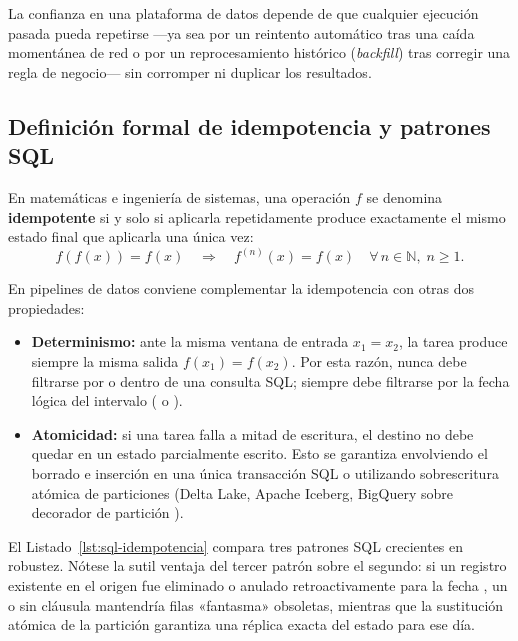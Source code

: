 La confianza en una plataforma de datos depende de que cualquier ejecución pasada pueda repetirse ---ya sea por un reintento automático tras una caída momentánea de red o por un reprocesamiento histórico (\textit{backfill}) tras corregir una regla de negocio--- sin corromper ni duplicar los resultados.

\subsection{Definición formal de idempotencia y patrones SQL}

En matemáticas e ingeniería de sistemas, una operación $f$ se denomina \textbf{idempotente} si y solo si aplicarla repetidamente produce exactamente el mismo estado final que aplicarla una única vez:
\begin{equation}
  f(f(x)) = f(x) \quad \Longrightarrow \quad f^{(n)}(x) = f(x) \quad \forall\, n \in \mathbb{N},\; n \ge 1.
  \label{eq:idempotencia}
\end{equation}

En pipelines de datos conviene complementar la idempotencia con otras dos propiedades:
\begin{itemize}
  \item \textbf{Determinismo:} ante la misma ventana de entrada $x_1 = x_2$, la tarea produce siempre la misma salida $f(x_1) = f(x_2)$. Por esta razón, nunca debe filtrarse por  o  dentro de una consulta SQL; siempre debe filtrarse por la fecha lógica del intervalo ( o ).
  \item \textbf{Atomicidad:} si una tarea falla a mitad de escritura, el destino no debe quedar en un estado parcialmente escrito. Esto se garantiza envolviendo el borrado e inserción en una única transacción SQL o utilizando sobrescritura atómica de particiones (Delta Lake, Apache Iceberg, BigQuery  sobre decorador de partición ).
\end{itemize}

El Listado~\ref{lst:sql-idempotencia} compara tres patrones SQL crecientes en robustez. Nótese la sutil ventaja del tercer patrón sobre el segundo: si un registro existente en el origen fue eliminado o anulado retroactivamente para la fecha , un  o  sin cláusula  mantendría filas «fantasma» obsoletas, mientras que la sustitución atómica de la partición garantiza una réplica exacta del estado para ese día.

